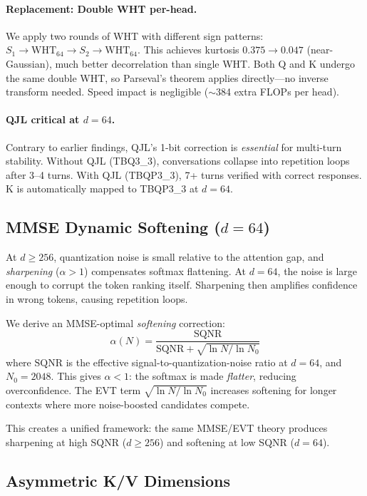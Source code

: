 \documentclass[10pt,twocolumn]{article}
\begin{document}
\paragraph{Replacement: Double WHT per-head.} We apply two rounds of WHT with different sign patterns: $S_1 \to \text{WHT}_{64} \to S_2 \to \text{WHT}_{64}$. This achieves kurtosis $0.375 \to 0.047$ (near-Gaussian), much better decorrelation than single WHT. Both Q and K undergo the same double WHT, so Parseval's theorem applies directly---no inverse transform needed. Speed impact is negligible ($\sim$384 extra FLOPs per head).

\paragraph{QJL critical at $d=64$.} Contrary to earlier findings, QJL's 1-bit correction is \emph{essential} for multi-turn stability. Without QJL (TBQ3\_3), conversations collapse into repetition loops after 3--4 turns. With QJL (TBQP3\_3), 7+ turns verified with correct responses. K is automatically mapped to TBQP3\_3 at $d=64$.

\subsection{MMSE Dynamic Softening ($d=64$)}

At $d \geq 256$, quantization noise is small relative to the attention gap, and \emph{sharpening} ($\alpha > 1$) compensates softmax flattening. At $d=64$, the noise is large enough to corrupt the token ranking itself. Sharpening then amplifies confidence in wrong tokens, causing repetition loops.

We derive an MMSE-optimal \emph{softening} correction:
\begin{equation}
\alpha(N) = \frac{\text{SQNR}}{\text{SQNR} + \sqrt{\ln N / \ln N_0}}
\end{equation}
where $\text{SQNR}$ is the effective signal-to-quantization-noise ratio at $d=64$, and $N_0 = 2048$. This gives $\alpha < 1$: the softmax is made \emph{flatter}, reducing overconfidence. The EVT term $\sqrt{\ln N / \ln N_0}$ increases softening for longer contexts where more noise-boosted candidates compete.

This creates a unified framework: the same MMSE/EVT theory produces sharpening at high SQNR ($d \geq 256$) and softening at low SQNR ($d = 64$).

\subsection{Asymmetric K/V Dimensions}
\end{document}
